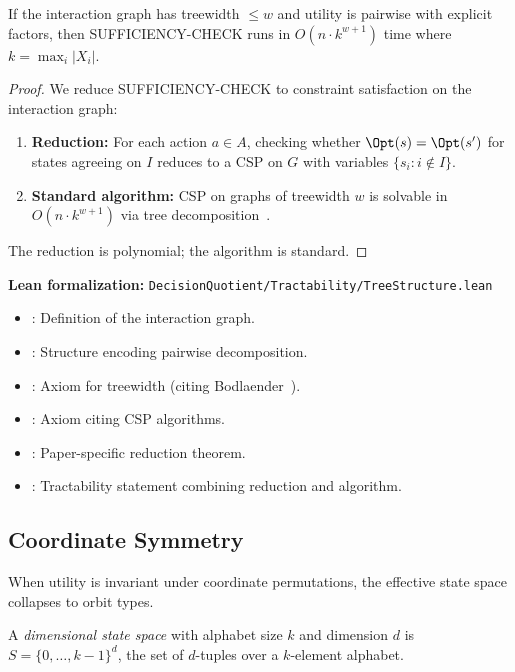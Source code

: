 \begin{theorem}\label{thm:treewidth}
If the interaction graph has treewidth $\leq w$ and utility is pairwise with explicit factors, then SUFFICIENCY-CHECK runs in $O(n \cdot k^{w+1})$ time where $k = \max_i |X_i|$.
\end{theorem}

\begin{proof}
We reduce SUFFICIENCY-CHECK to constraint satisfaction on the interaction graph:
\begin{enumerate}
\item \textbf{Reduction:} For each action $a \in A$, checking whether $\Opt(s) = \Opt(s')$ for states agreeing on $I$ reduces to a CSP on $G$ with variables $\{s_i : i \notin I\}$.
\item \textbf{Standard algorithm:} CSP on graphs of treewidth $w$ is solvable in $O(n \cdot k^{w+1})$ via tree decomposition~\cite{bodlaender1993tourist,freuder1990complexity}.
\end{enumerate}
The reduction is polynomial; the algorithm is standard.
\end{proof}

\noindent\textbf{Lean formalization:} \texttt{DecisionQuotient/Tractability/TreeStructure.lean}
\begin{itemize}
\item {}: Definition of the interaction graph.
\item {}: Structure encoding pairwise decomposition.
\item {}: Axiom for treewidth (citing Bodlaender~\cite{bodlaender1993tourist}).
\item {}: Axiom citing CSP algorithms.
\item {}: Paper-specific reduction theorem.
\item {}: Tractability statement combining reduction and algorithm.
\end{itemize}


\subsection{Coordinate Symmetry}\label{sec:tract-symmetry}

When utility is invariant under coordinate permutations, the effective state space collapses to orbit types.

\begin{definition}\label{def:dimensional}
A \emph{dimensional state space} with alphabet size $k$ and dimension $d$ is $S = \{0, \ldots, k-1\}^d$, the set of $d$-tuples over a $k$-element alphabet.
\end{definition}

